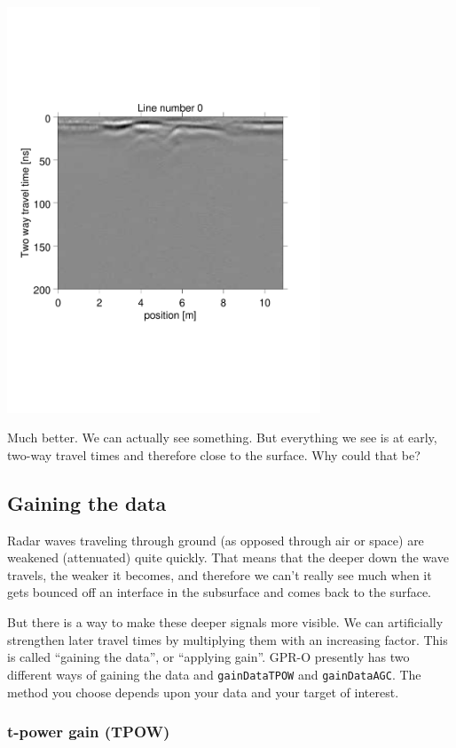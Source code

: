 \documentclass[11pt]{article}
\begin{document}
\begin{center}
\includegraphics[width=0.7\textwidth, trim = 0.9cm 6cm 2cm
  6.5cm,clip]{figures/GPRlineH0}
\end{center}
 
Much better. We can actually see something. But everything we see is
at early, two-way travel times and therefore close to the surface. Why
could that be?

\subsection{Gaining the data}

Radar waves traveling through ground (as opposed
through air or space) are weakened (attenuated) quite
quickly. That means that the deeper down the wave travels, the weaker it
becomes, and therefore we can't really see much when it gets bounced off an
interface in the subsurface and comes back to the surface.
 
But there is a way to make these deeper signals more visible. We can
artificially strengthen later travel times by multiplying them with an
increasing factor. This is called ``gaining the data'', or ``applying
gain''. GPR-O presently has two different ways of gaining the data and
\verb#gainDataTPOW# and \verb#gainDataAGC#. The method you choose depends
upon your data and your target of interest.


\subsubsection{t-power gain (TPOW)}
\end{document}
